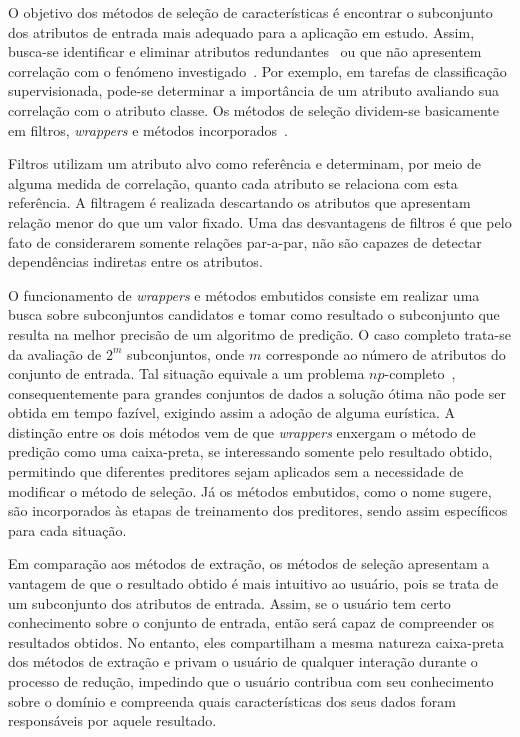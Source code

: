 O objetivo dos métodos de seleção de características é
encontrar o subconjunto  dos atributos de entrada mais
adequado para a aplicação em estudo. Assim, busca-se
identificar e eliminar atributos
redundantes~\cite{Kohavi1997} ou que não apresentem
correlação com o fenómeno investigado~\cite{Nilsson2007}.
Por exemplo, em tarefas de classificação supervisionada,
pode-se determinar a importância de um atributo avaliando
sua correlação com o atributo classe. Os métodos de seleção
dividem-se basicamente em filtros, \emph{wrappers} e métodos
incorporados~\cite{Guyon2003}. 

Filtros utilizam um atributo alvo como referência e
determinam, por meio de alguma medida de correlação, quanto
cada atributo se relaciona com esta referência. A filtragem
é realizada descartando os atributos que apresentam relação
menor do que um valor fixado. Uma das desvantagens de
filtros é que pelo fato de considerarem somente relações
par-a-par, não são capazes de detectar dependências
indiretas entre os atributos. 

O funcionamento de \emph{wrappers} e métodos embutidos
consiste em realizar uma busca sobre subconjuntos candidatos
e tomar como resultado o subconjunto que resulta na melhor
precisão de um algoritmo de predição. O caso completo
trata-se da avaliação de $2^m$ subconjuntos, onde $m$
corresponde ao número de atributos do conjunto de entrada.
Tal situação equivale a um problema
$np$-completo~\cite{Amaldi1998}, consequentemente para
grandes conjuntos de dados a solução ótima não pode ser
obtida em tempo fazível, exigindo assim a adoção de alguma
eurística. A distinção entre os dois métodos vem de que
\emph{wrappers} enxergam o método de predição como uma
caixa-preta, se interessando somente pelo resultado obtido,
permitindo que diferentes preditores sejam aplicados sem a
necessidade de modificar o método de seleção. Já os métodos
embutidos, como o nome sugere, são incorporados às etapas de
treinamento dos preditores, sendo assim específicos para
cada situação. 

Em comparação aos métodos de extração, os métodos de seleção
apresentam a vantagem de que o resultado obtido é mais
intuitivo ao usuário, pois se trata de um subconjunto dos
atributos de entrada. Assim, se o usuário tem certo
conhecimento sobre o conjunto de entrada, então será capaz
de compreender os resultados obtidos. No entanto, eles
compartilham a mesma natureza caixa-preta dos métodos de
extração e privam o usuário de qualquer interação durante o
processo de redução, impedindo que o usuário contribua com
seu conhecimento sobre o domínio e compreenda quais
características dos seus dados foram responsáveis por aquele
resultado.

